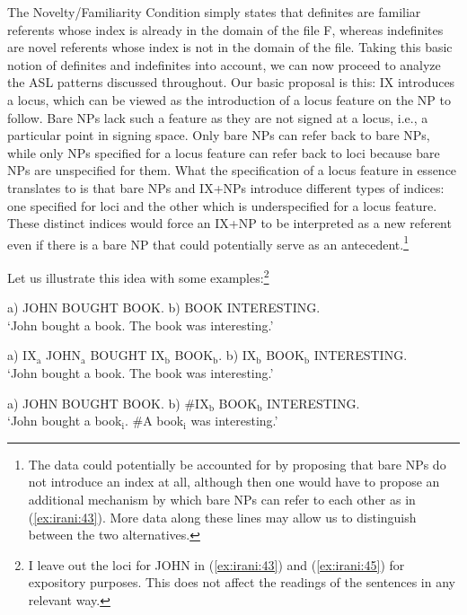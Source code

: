 \documentclass[output=paper,
modfonts
]{langscibook}
\begin{document}
The Novelty/Familiarity Condition simply states that definites are familiar referents whose index is already in the domain of the file F, whereas indefinites are novel referents whose index is not in the domain of the file. Taking this basic notion of definites and indefinites into account, we can now proceed to analyze the ASL patterns discussed throughout. Our basic proposal is this: IX introduces a locus, which can be viewed as the introduction of a locus feature on the NP to follow. Bare NPs lack such a feature as they are not signed at a locus, i.e., a particular point in signing space. Only bare NPs can refer back to bare NPs, while only NPs specified for a locus feature can refer back to loci because bare NPs are unspecified for them. What the specification of a locus feature in essence translates to is that bare NPs and IX+NPs introduce different types of indices: one specified for loci and the other which is underspecified for a locus feature. These distinct indices would force an IX+NP to be interpreted as a new referent even if there is a bare NP that could potentially serve as an antecedent.\footnote{The data could potentially be accounted for by proposing that bare NPs do not introduce an index at all, although then one would have to propose an additional mechanism by which bare NPs can refer to each other as in (\ref{ex:irani:43}). More data along these lines may allow us to distinguish between the two alternatives.} 

Let us illustrate this idea with some examples:\footnote{I leave out the loci for JOHN in (\ref{ex:irani:43}) and (\ref{ex:irani:45}) for expository purposes. This does not affect the readings of the sentences in any relevant way.} 

\begin{exe}
\ex \label{ex:irani:43} a) JOHN BOUGHT BOOK. b) BOOK INTERESTING. \\
`John bought a book. The book was interesting.'

\ex \label{ex:irani:44} a) IX$_\text{a}$ JOHN$_\text{a}$ BOUGHT IX$_\text{b}$ BOOK$_\text{b}$. b) IX$_\text{b}$ BOOK$_\text{b}$ INTERESTING. \\
`John bought a book. The book was interesting.'

\ex \label{ex:irani:45} a) JOHN BOUGHT BOOK. b) \#IX$_\text{b}$ BOOK$_\text{b}$ INTERESTING. \\
`John bought a book$_\text{i}$. \#A book$_\text{i}$ was interesting.'  
\end{exe}
\end{document}
